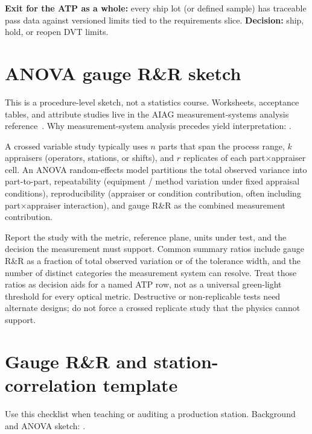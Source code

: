 \textbf{Exit for the ATP as a whole:} every ship lot (or defined sample) has
traceable pass data against versioned limits tied to the requirements slice.
\textbf{Decision:} ship, hold, or reopen DVT limits.

\section{ANOVA gauge R\&R sketch}
\label{sec:mfg-anova-gauge}

This is a procedure-level sketch, not a statistics course. Worksheets,
acceptance tables, and attribute studies live in the AIAG measurement-systems
analysis reference~\cite{aiagmsa}. Why measurement-system analysis precedes
yield interpretation: .

A crossed variable study typically uses $n$ parts that span the process range,
$k$ appraisers (operators, stations, or shifts), and $r$ replicates of each
part$\times$appraiser cell. An ANOVA random-effects model partitions the total
observed variance into part-to-part, repeatability (equipment / method
variation under fixed appraisal conditions), reproducibility (appraiser or
condition contribution, often including part$\times$appraiser interaction), and
gauge R\&R as the combined measurement contribution.

Report the study with the metric, reference plane, units under test, and the
decision the measurement must support. Common summary ratios include gauge R\&R
as a fraction of total observed variation or of the tolerance width, and the
number of distinct categories the measurement system can resolve. Treat those
ratios as decision aids for a named ATP row, not as a universal green-light
threshold for every optical metric. Destructive or non-replicable tests need
alternate designs; do not force a crossed replicate study that the physics
cannot support.

\section{Gauge R\&R and station-correlation template}
\label{sec:mfg-gauge-template}

Use this checklist when teaching or auditing a production station. Background
and ANOVA sketch: .

